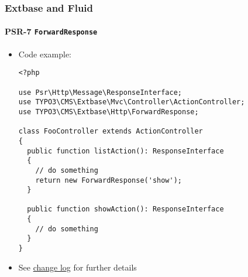 %

\begin{frame}[fragile]
	\frametitle{Extbase and Fluid}
	\framesubtitle{PSR-7 \texttt{ForwardResponse}}


	\begin{itemize}
		\item Code example:
\begin{lstlisting}
<?php

use Psr\Http\Message\ResponseInterface;
use TYPO3\CMS\Extbase\Mvc\Controller\ActionController;
use TYPO3\CMS\Extbase\Http\ForwardResponse;

class FooController extends ActionController
{
  public function listAction(): ResponseInterface
  {
    // do something
    return new ForwardResponse('show');
  }

  public function showAction(): ResponseInterface
  {
    // do something
  }
}
\end{lstlisting}

		\item See \href{https://docs.typo3.org/c/typo3/cms-core/master/en-us/Changelog/11.0/Deprecation-92784-ExtbaseControllerActionsMustReturnResponseInterface.html}{change log}
			for further details

	\end{itemize}

\end{frame}

